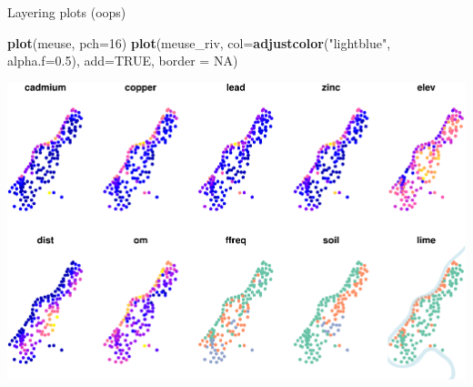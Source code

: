 \documentclass[11pt,ignorenonframetext,]{beamer}
\newenvironment{Shaded}{}{}
\newcommand{\DataTypeTok}[1]{\textcolor[rgb]{0.56,0.13,0.00}{#1}}
\newcommand{\DecValTok}[1]{\textcolor[rgb]{0.25,0.63,0.44}{#1}}
\newcommand{\FloatTok}[1]{\textcolor[rgb]{0.25,0.63,0.44}{#1}}
\newcommand{\KeywordTok}[1]{\textcolor[rgb]{0.00,0.44,0.13}{\textbf{#1}}}
\newcommand{\NormalTok}[1]{#1}
\newcommand{\OtherTok}[1]{\textcolor[rgb]{0.00,0.44,0.13}{#1}}
\newcommand{\StringTok}[1]{\textcolor[rgb]{0.25,0.44,0.63}{#1}}
\let\oldShaded\Shaded
\let\endoldShaded\endShaded
\renewenvironment{Shaded}{\footnotesize\begin{spacing}{0.9}\oldShaded}{\endoldShaded\end{spacing}}
\let\oldverbatim\verbatim
\let\endoldverbatim\endverbatim
\newcommand{\scriptoutput}{
  \renewenvironment{Shaded}{\scriptsize\begin{spacing}{0.9}\oldShaded}{\endoldShaded\end{spacing}}
  \renewenvironment{verbatim}{\scriptsize\begin{spacing}{0.9}\oldverbatim}{\endoldverbatim\end{spacing}}
}
\begin{document}
\begin{frame}[fragile,t]{Layering plots (oops)}
\protect\hypertarget{layering-plots-oops}{}

\scriptoutput

\begin{Shaded}
\begin{Highlighting}[]
\KeywordTok{plot}\NormalTok{(meuse, }\DataTypeTok{pch=}\DecValTok{16}\NormalTok{)}
\KeywordTok{plot}\NormalTok{(meuse_riv, }\DataTypeTok{col=}\KeywordTok{adjustcolor}\NormalTok{(}\StringTok{"lightblue"}\NormalTok{, }\DataTypeTok{alpha.f=}\FloatTok{0.5}\NormalTok{), }\DataTypeTok{add=}\OtherTok{TRUE}\NormalTok{, }\DataTypeTok{border =} \OtherTok{NA}\NormalTok{)}
\end{Highlighting}
\end{Shaded}

\begin{center}\includegraphics[width=\textwidth]{Lec16_files/figure-beamer/unnamed-chunk-12-1} \end{center}

\end{frame}
\end{document}

